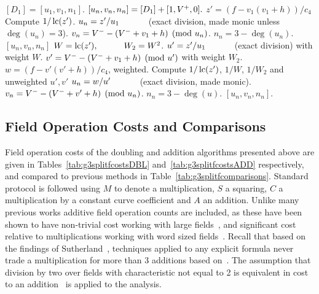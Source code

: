 \begin{algorithm}[H]
\caption{Genus 3 Split Model Degree 0 Add with Two Up Adjusts\label{alg:g3explSPLIT0ADDUP2}}
\begin{algorithmic} [1]
\Require $[D_1] = [u_1, v_1, n_1]$. \smallskip
\Ensure $[u_n,v_n,n_n] = [D_1] + [1,V^{+},0].$
\algrule
\State $z' = (f - v_1(v_1 + h))/c_4$
    \State Compute $1/\operatorname{lc}(z')$.
    \State $u_n = z'/u_1 \quad\quad\quad$ (exact division, made monic unless $\deg(u_n) = 3$).
    \State $v_n = V^{-} - (V^{-} + v_1 + h) \pmod{u_n}$.
    \State $n_n = 3 - \deg(u_n)$.
    \Return $[u_n,v_n,n_n]$
\EndIf
\State $W = \operatorname{lc}(z'), \quad\quad\quad W_2 = W^2$.
\State $u' = z'/u_1 \quad\quad\quad$ (exact division) with weight $W$.
\State $v' = V^{-} - (V^{-} + v_1 + h) \pmod{u'}$ with weight $W_2$.
\State $w = (f - v'(v' + h))/c_4$, weighted.
\State Compute $1/\operatorname{lc}(z')$, $1/W$, $1/W_2$ and unweighted $u',v'$
\State $u_n = w/u' \quad\quad\quad$ (exact division, made monic).
\State $v_n = V^{-} - (V^{-} + v' + h) \pmod{u_n}$.
\State $n_n = 3 - \deg(u)$.
\State \Return $[u_n,v_n,n_n]$.
\end{algorithmic}
\end{algorithm}





\subsection{Field Operation Costs and Comparisons}
\label{sec:g3splitFieldCosts}
Field operation costs of the doubling and addition algorithms presented above
are given in Tables~\ref{tab:g3splitfcostsDBL} and~\ref{tab:g3splitfcostsADD}
respectively, and compared to previous methods in
Table~\ref{tab:g3splitfcomparisons}. Standard protocol is followed using $M$ to
denote a multiplication, $S$ a squaring, $C$ a multiplication by a constant
curve coefficient and $A$ an addition. Unlike many previous works additive field
operation counts are included, as these have been shown to have non-trivial cost
working with large fields~\cite{HisilCostello_jaccoord_2014}, and significant
cost relative to multiplications working with word sized
fields~\cite{Sutherland_sato_2016}. Recall that based on the findings of
Sutherland~\cite{Sutherland_sato_2016,Sutherland_g3_2019}, techniques applied to
any explicit formula never trade a multiplication for more than 3 additions
based on~\cite{Sutherland_sato_2016}. The assumption that division by two over
fields with characteristic not equal to 2 is equivalent in cost to an
addition~\cite{Sutherland_g3_2019} is applied to the analysis.


